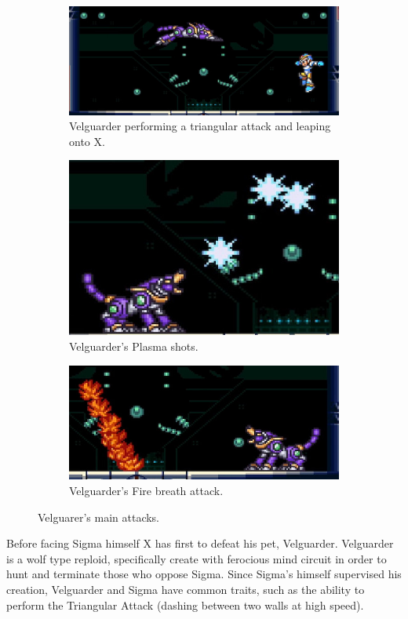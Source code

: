 \begin{figure}[htp]
	\centering
	\begin{subfigure}{0.7\linewidth}
		\centering
		\includegraphics[width=\linewidth]{figures/X1/Sigma_stages/Velguarder_leap_1.jpg}
		\caption{Velguarder performing a triangular attack and leaping onto X.}
	\end{subfigure}
	\begin{subfigure}[t]{0.40\linewidth}
		\centering
		\includegraphics[width=\linewidth]{figures/X1/Sigma_stages/Velguarder_plasma.jpg}
		\caption{Velguarder's Plasma shots.}
	\end{subfigure}
	\begin{subfigure}[t]{0.5\linewidth}
		\centering
		\includegraphics[width=\linewidth]{figures/X1/Sigma_stages/Velguarder_fire.jpg}
		\caption{Velguarder's Fire breath attack.}
	\end{subfigure}
	\caption{Velguarer's main attacks.}
\end{figure} 
Before facing Sigma himself X has first to defeat his pet, Velguarder.
Velguarder is a wolf type reploid, specifically create with ferocious mind circuit in order to hunt and terminate those who oppose Sigma. Since Sigma's himself supervised his creation, Velguarder and Sigma have common traits, such as the ability to perform the Triangular Attack (dashing between two walls at high speed).

